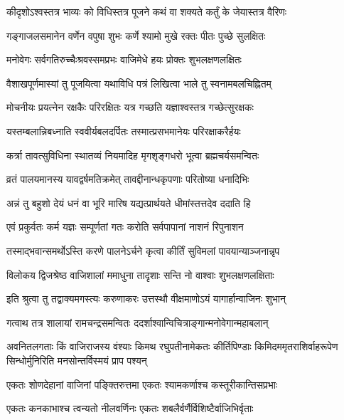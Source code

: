

\twolineshloka
{कीदृशोऽश्वस्तत्र भाव्यः को विधिस्तत्र पूजने}
{कथं वा शक्यते कर्तुं के जेयास्तत्र वैरिणः}%


\twolineshloka
{गङ्गाजलसमानेन वर्णेन वपुषा शुभः}
{कर्णे श्यामो मुखे रक्तः पीतः पुच्छे सुलक्षितः}%

\twolineshloka
{मनोवेगः सर्वगतिरुच्चैःश्रवस्समप्रभः}
{वाजिमेधे हयः प्रोक्तः शुभलक्षणलक्षितः}%

\twolineshloka
{वैशाखपूर्णमास्यां तु पूजयित्वा यथाविधि}
{पत्रं लिखित्वा भाले तु स्वनामबलचिह्नितम्}%

\twolineshloka
{मोचनीयः प्रयत्नेन रक्षकैः परिरक्षितः}
{यत्र गच्छति यज्ञाश्वस्तत्र गच्छेत्सुरक्षकः}%

\twolineshloka
{यस्तम्बलान्निबध्नाति स्ववीर्यबलदर्पितः}
{तस्मात्प्रसभमानेयः परिरक्षाकरैर्हयः}%

\twolineshloka
{कर्त्रा तावत्सुविधिना स्थातव्यं नियमादिह}
{मृगशृङ्गधरो भूत्वा ब्रह्मचर्यसमन्वितः}%

\twolineshloka
{व्रतं पालयमानस्य यावद्वर्षमतिक्रमेत्}
{तावद्दीनान्धकृपणाः परितोष्या धनादिभिः}%

\twolineshloka
{अन्नं तु बहुशो देयं धनं वा भूरि मारिष}
{यद्यत्प्रार्थयते धीमांस्तत्तदेव ददाति हि}%

\twolineshloka
{एवं प्रकुर्वतः कर्म यज्ञः सम्पूर्णतां गतः}
{करोति सर्वपापानां नाशनं रिपुनाशन}%

\twolineshloka
{तस्माद्भवान्समर्थोऽस्ति करणे पालनेऽर्चने}
{कृत्वा कीर्तिं सुविमलां पावयान्याञ्जनान्नृप}%


\twolineshloka
{विलोकय द्विजश्रेष्ठ वाजिशालां ममाधुना}
{तादृशाः सन्ति नो वाश्वाः शुभलक्षणलक्षिताः}%

\twolineshloka
{इति श्रुत्वा तु तद्वाक्यमगस्त्यः करुणाकरः}
{उत्तस्थौ वीक्षमाणोऽयं यागार्हान्वाजिनः शुभान्}%

\twolineshloka
{गत्वाथ तत्र शालायां रामचन्द्रसमन्वितः}
{ददर्शाश्वान्विचित्राङ्गान्मनोवेगान्महाबलान्}%

\twolineshloka
{अवनितलगताः किं वाजिराजस्य वंश्याः किमथ रघुपतीनामेकतः कीर्तिपिण्डाः}
{किमिदममृतराशिर्वाहरूपेण सिन्धोर्मुनिरिति मनसोन्तर्विस्मयं प्राप पश्यन्}%

\twolineshloka
{एकतः शोणदेहानां वाजिनां पङ्क्तिरुत्तमा}
{एकतः श्यामकर्णाश्च कस्तूरीकान्तिसप्रभाः}%

\twolineshloka
{एकतः कनकाभाश्च त्वन्यतो नीलवर्णिनः}
{एकतः शबलैर्वर्णैर्विशिष्टैर्वाजिभिर्वृताः}%

